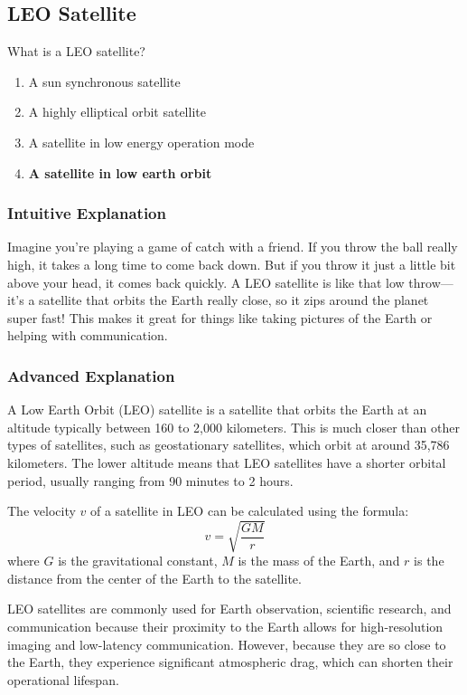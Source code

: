 \subsection{LEO Satellite}
\label{T8B10}

\begin{tcolorbox}[colback=gray!10!white,colframe=black!75!black,title=T8B10]
What is a LEO satellite?
\begin{enumerate}[label=\Alph*)]
    \item A sun synchronous satellite
    \item A highly elliptical orbit satellite
    \item A satellite in low energy operation mode
    \item \textbf{A satellite in low earth orbit}
\end{enumerate}
\end{tcolorbox}

\subsubsection{Intuitive Explanation}
Imagine you're playing a game of catch with a friend. If you throw the ball really high, it takes a long time to come back down. But if you throw it just a little bit above your head, it comes back quickly. A LEO satellite is like that low throw—it's a satellite that orbits the Earth really close, so it zips around the planet super fast! This makes it great for things like taking pictures of the Earth or helping with communication.

\subsubsection{Advanced Explanation}
A Low Earth Orbit (LEO) satellite is a satellite that orbits the Earth at an altitude typically between 160 to 2,000 kilometers. This is much closer than other types of satellites, such as geostationary satellites, which orbit at around 35,786 kilometers. The lower altitude means that LEO satellites have a shorter orbital period, usually ranging from 90 minutes to 2 hours. 

The velocity \( v \) of a satellite in LEO can be calculated using the formula:
\[
v = \sqrt{\frac{GM}{r}}
\]
where \( G \) is the gravitational constant, \( M \) is the mass of the Earth, and \( r \) is the distance from the center of the Earth to the satellite. 

LEO satellites are commonly used for Earth observation, scientific research, and communication because their proximity to the Earth allows for high-resolution imaging and low-latency communication. However, because they are so close to the Earth, they experience significant atmospheric drag, which can shorten their operational lifespan.

